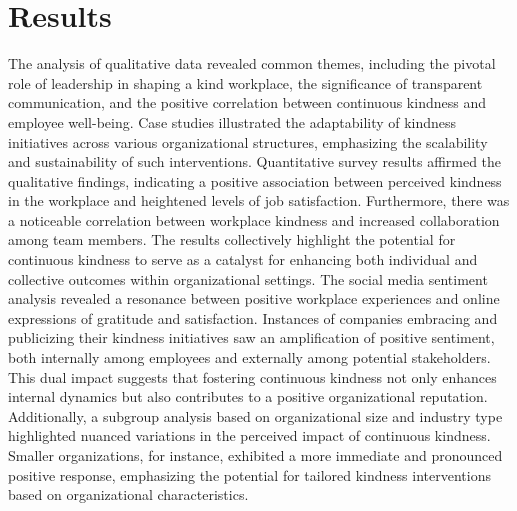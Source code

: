 \documentclass[a4paper, 11pt]{report}
\begin{document}
\section{Results}
The analysis of qualitative data revealed common themes, including the pivotal role of leadership in shaping a kind workplace, the significance of transparent communication, and the positive correlation between continuous kindness and employee well-being. Case studies illustrated the adaptability of kindness initiatives across various organizational structures, emphasizing the scalability and sustainability of such interventions.
\vspace{5mm} %
\newline
Quantitative survey results affirmed the qualitative findings, indicating a positive association between perceived kindness in the workplace and heightened levels of job satisfaction. Furthermore, there was a noticeable correlation between workplace kindness and increased collaboration among team members. The results collectively highlight the potential for continuous kindness to serve as a catalyst for enhancing both individual and collective outcomes within organizational settings.
\vspace{5mm} %
\newline
The social media sentiment analysis revealed a resonance between positive workplace experiences and online expressions of gratitude and satisfaction. Instances of companies embracing and publicizing their kindness initiatives saw an amplification of positive sentiment, both internally among employees and externally among potential stakeholders. This dual impact suggests that fostering continuous kindness not only enhances internal dynamics but also contributes to a positive organizational reputation.
\vspace{5mm} %
\newline
Additionally, a subgroup analysis based on organizational size and industry type highlighted nuanced variations in the perceived impact of continuous kindness. Smaller organizations, for instance, exhibited a more immediate and pronounced positive response, emphasizing the potential for tailored kindness interventions based on organizational characteristics.
\end{document}

